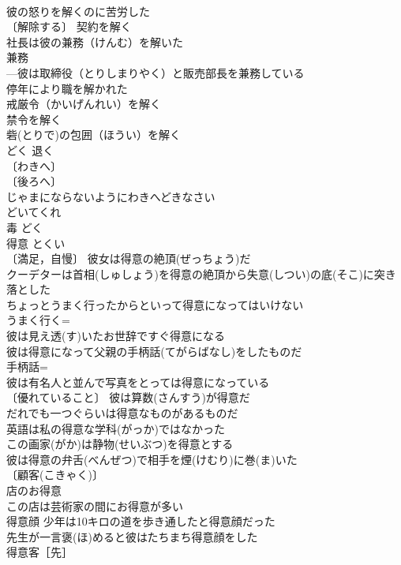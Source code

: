 \documentclass[8pt]{extreport}
\begin{document}
\begin{CJK}{UTF8}{min}
\\	彼の怒りを解くのに苦労した 
\\	〔解除する〕 契約を解く 
\\	社長は彼の兼務（けんむ）を解いた 
\\	兼務　
\\	---彼は取締役（とりしまりやく）と販売部長を兼務している 
\\	停年により職を解かれた 
\\	戒厳令（かいげんれい）を解く 
\\	禁令を解く 
\\	砦(とりで)の包囲（ほうい）を解く 
\\	どく		退く 
\\	〔わきへ〕
\\	〔後ろへ〕
\\	じゃまにならないようにわきへどきなさい 
\\	どいてくれ 
\\	毒	どく	
\\	得意	とくい	
\\	〔満足，自慢〕 彼女は得意の絶頂(ぜっちょう)だ 
\\	クーデターは首相(しゅしょう)を得意の絶頂から失意(しつい)の底(そこ)に突き落とした 
\\	ちょっとうまく行ったからといって得意になってはいけない 
\\	うまく行く=
\\	彼は見え透(す)いたお世辞ですぐ得意になる 
\\	彼は得意になって父親の手柄話(てがらばなし)をしたものだ 
\\	手柄話=
\\	彼は有名人と並んで写真をとっては得意になっている 
\\	〔優れていること〕 彼は算数(さんすう)が得意だ 
\\	だれでも一つぐらいは得意なものがあるものだ 
\\	英語は私の得意な学科(がっか)ではなかった 
\\	この画家(がか)は静物(せいぶつ)を得意とする 
\\	彼は得意の弁舌(べんぜつ)で相手を煙(けむり)に巻(ま)いた 
\\	〔顧客(こきゃく)〕
\\	店のお得意 
\\	この店は芸術家の間にお得意が多い 
\\	得意顔 少年は10キロの道を歩き通したと得意顔だった 
\\	先生が一言褒(ほ)めると彼はたちまち得意顔をした 
\\	得意客［先］ 

\end{CJK}
\end{document}
